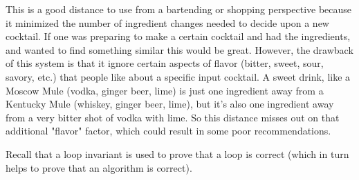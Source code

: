 \documentclass{article}
\begin{document}
\begin{enumerate}
        This is a good distance to use from a bartending or shopping perspective because it minimized the number of ingredient changes needed to decide upon a new cocktail. If one was preparing to make a certain cocktail and had the ingredients, and wanted to find something similar this would be great. However, the drawback of this system is that it ignore certain aspects of flavor (bitter, sweet, sour, savory, etc.) that people like about a specific input cocktail. A sweet drink, like a Moscow Mule (vodka, ginger beer, lime) is just one ingredient away from a Kentucky Mule (whiskey, ginger beer, lime), but it's also one ingredient away from a very bitter shot of vodka with lime. So this distance misses out on that additional "flavor" factor, which could result in some poor recommendations.

\end{enumerate}


\collab{} 

Recall that a loop invariant is used to prove that a loop is correct (which in
turn helps to prove that an algorithm is correct).
    
\end{document}
